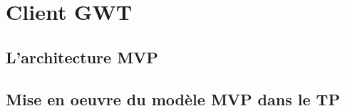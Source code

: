 \chapter{Client GWT}

\section{L'architecture MVP}
\section{Mise en oeuvre du modèle MVP dans le TP}
